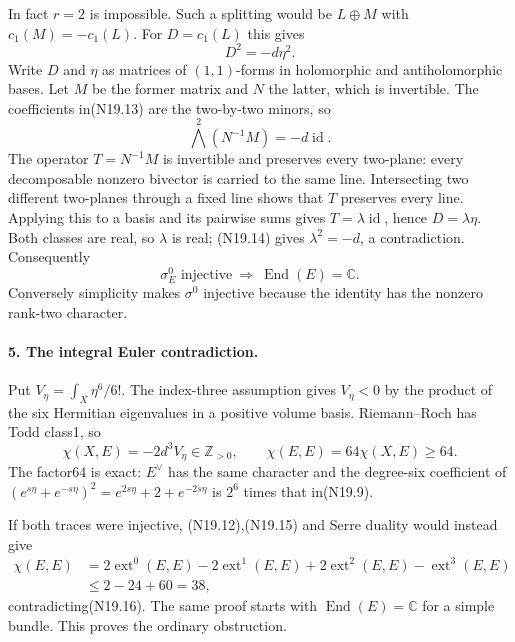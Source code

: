 In fact $r=2$ is impossible. Such a splitting would be $L\oplus M$
with $c_1(M)=-c_1(L)$. For $D=c_1(L)$ this gives
\[
                              D^2=-d\eta^2.                    \tag{N19.13}
\]
Write $D$ and $\eta$ as matrices of $(1,1)$-forms in holomorphic
and antiholomorphic bases. Let $M$ be the former matrix and $N$
the latter, which is invertible. The coefficients in(N19.13)
are the two-by-two minors, so
\[
                    \bigwedge^2(N^{-1}M)=-d\operatorname{id}.   \tag{N19.14}
\]
The operator $T=N^{-1}M$ is invertible and preserves every two-plane:
every decomposable nonzero bivector is carried to the same line.
Intersecting two different two-planes through a fixed line shows
that $T$ preserves every line. Applying this to a basis and its
pairwise sums gives $T=\lambda\operatorname{id}$, hence
$D=\lambda\eta$. Both classes are real, so $\lambda$ is real;
(N19.14) gives $\lambda^2=-d$, a contradiction. Consequently
\[
 \sigma_E^0\text{ injective}\ \Longrightarrow\
                       \operatorname{End}(E)=\mathbb C.        \tag{N19.15}
\]
Conversely simplicity makes $\sigma^0$ injective because the
identity has the nonzero rank-two character.

\paragraph{5. The integral Euler contradiction.}
Put $V_\eta=\int_X\eta^6/6!$. The index-three assumption gives
$V_\eta<0$ by the product of the six Hermitian eigenvalues in
a positive volume basis. Riemann--Roch has Todd class1, so
\[
 \chi(X,E)=-2d^3V_\eta\in\mathbb Z_{>0},\qquad
                    \chi(E,E)=64\chi(X,E)\ge64.                \tag{N19.16}
\]
The factor64 is exact: $E^\vee$ has the same character and the
degree-six coefficient of
$(e^{s\eta}+e^{-s\eta})^2=e^{2s\eta}+2+e^{-2s\eta}$
is $2^6$ times that in(N19.9).

If both traces were injective, (N19.12),(N19.15) and Serre duality
would instead give
\[
 \begin{split}
 \chi(E,E)&=2\operatorname{ext}^0(E,E)-2\operatorname{ext}^1(E,E)
                +2\operatorname{ext}^2(E,E)-\operatorname{ext}^3(E,E)\\
          &\le2-24+60=38,
 \end{split}                                                   \tag{N19.17}
\]
contradicting(N19.16). The same proof starts with
$\operatorname{End}(E)=\mathbb C$ for a simple bundle. This proves
the ordinary obstruction.

